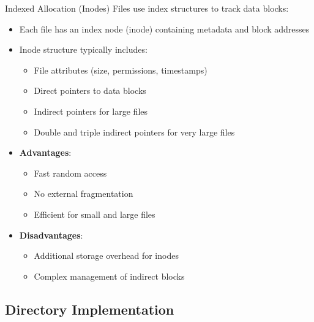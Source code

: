 \begin{concept}{Indexed Allocation (Inodes)}
    Files use index structures to track data blocks:
    \begin{itemize}
        \item Each file has an index node (inode) containing metadata and block addresses
        \item Inode structure typically includes:
            \begin{itemize}
                \item File attributes (size, permissions, timestamps)
                \item Direct pointers to data blocks
                \item Indirect pointers for large files
                \item Double and triple indirect pointers for very large files
            \end{itemize}
        \item \textbf{Advantages}:
            \begin{itemize}
                \item Fast random access
                \item No external fragmentation
                \item Efficient for small and large files
            \end{itemize}
        \item \textbf{Disadvantages}:
            \begin{itemize}
                \item Additional storage overhead for inodes
                \item Complex management of indirect blocks
            \end{itemize}
    \end{itemize}
\end{concept}

\subsection{Directory Implementation}

